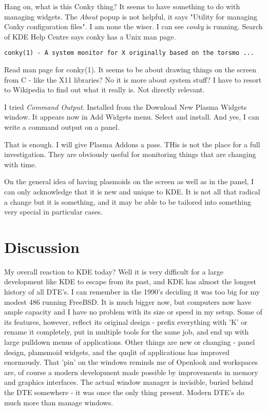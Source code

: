 \documentclass{article}  %
\begin{document}
Hang on, what is this Conky thing? It seems to have something to do with managing widgets. The {\em About} popup is not helpful, it says "Utility for managing Conky configuration files". I am none the wiser.  I can see {\em conky} is running.  Search of KDE Help Centre says conky has a Unix man page. 
\begin{verbatim}
conky(1) - A system monitor for X originally based on the torsmo ...
\end{verbatim}
Read man page for conky(1). It seems to be about drawing things on the screen from C - like the X11 libraries?  No it is more about system stuff?  I have to resort to Wikipedia to find out what it really is. Not directly relevant.

I tried {\em Command Output}. Installed from the Download New Plasma Widgets window. It appears now in Add Widgets menu. Select and install. And yes, I can write a command output on a panel.

That is enough. I will give Plasma Addons a pass.  THis is not the place for a full investigation. They are obviously useful for monitoring things that are changing with time.

On the general idea of having plasmoids on the screen as well as in the panel, I can only acknowledge that it is new and unique to KDE. It is not all that radical a change but it is something, and it may be able to be tailored into something very special in particular cases.

\section{Discussion}
My overall reaction to KDE today? Well it is very difficult for a large development like KDE to escape from its past, and KDE has almost the longest history of all DTE's. I can remember in the 1990's deciding it was too big for my modest 486 running FreeBSD. It is much bigger now, but computers now have ample capacity and I have no problem with its size or speed in my setup.  Some of its features, however, reflect its original design - prefix everything with 'K' or rename it completely, put in multiple tools for the same job,  and end up with large pulldown menus of applications. Other things are new or changing - panel design, plamsmoid widgets, and the quqlit of applications has improved enormously. That 'pin' on the windows reminds me of Openlook and workspaces are, of course a modern development made possible by improvements in memory and graphics interfaces. The actual window manager is invisible, buried behind the DTE somewhere - it was once the only thing present. Modern DTE's do much more than manage windows.
\end{document}
